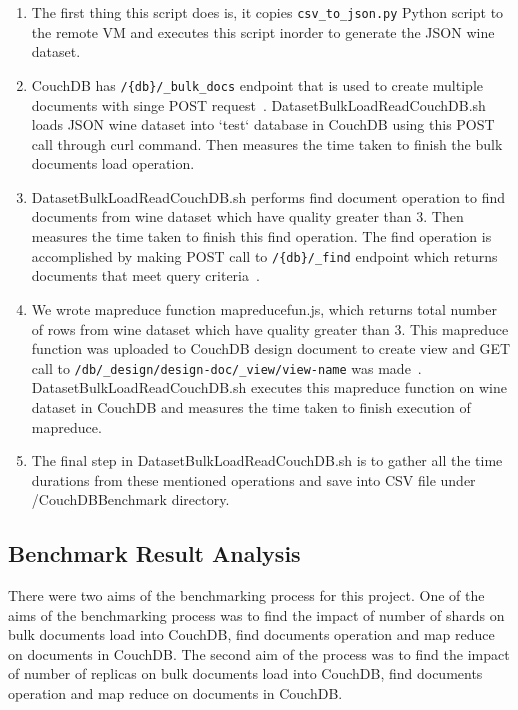 \begin{enumerate}
  \item The first thing this script does is, it copies
    \verb|csv_to_json.py| Python script to the remote VM and executes
    this script inorder to generate the JSON wine dataset.
  \item CouchDB has \verb|/{db}/_bulk_docs| endpoint that is used to
    create multiple documents with singe POST
    request~\cite{www-CouchdbBulkApi}. DatasetBulkLoadReadCouchDB.sh
    loads JSON wine dataset into `test` database in CouchDB  using
    this POST call through curl command. Then measures the time taken
    to finish the bulk documents load operation.

  \item DatasetBulkLoadReadCouchDB.sh performs find document operation
    to find documents from wine dataset which have quality greater
    than 3. Then measures the time taken to finish this find
    operation. The find operation is accomplished by making POST call
    to \verb|/{db}/_find| endpoint which returns documents that meet
    query criteria~\cite{www-CouchdbFind}. 

  \item We wrote mapreduce function mapreducefun.js, which returns
    total number of rows from wine dataset which have quality greater than 3. This mapreduce
    function was uploaded to CouchDB design document to create view and GET call to
    \verb|/db/_design/design-doc/_view/view-name| was
    made~\cite{www-CouchdbView}. DatasetBulkLoadReadCouchDB.sh
    executes this mapreduce function on wine dataset in CouchDB and
    measures the time taken to finish execution of mapreduce.
  \item The final step in DatasetBulkLoadReadCouchDB.sh is to gather
    all the time durations from these mentioned operations and save
    into CSV file under /CouchDBBenchmark directory.

\end{enumerate}

\subsection{Benchmark Result Analysis}
There were two aims of the benchmarking process for this project. One
of the aims of the benchmarking process was to find the impact of
number of shards on bulk documents load into CouchDB, find documents
operation and map reduce on documents in CouchDB. The second aim of
the process was to find the impact of number of replicas on bulk
documents load into CouchDB, find documents operation and map reduce
on documents in CouchDB. 

